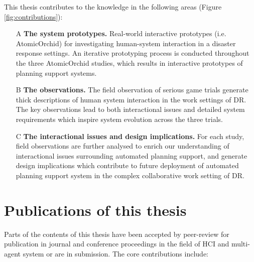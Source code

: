 This thesis contributes to the knowledge in the following areas (Figure \ref{fig:contributions}): \\

\begin{enumerate}
  \item[A] \textbf{The system prototypes.} Real-world interactive prototypes (i.e. AtomicOrchid) for investigating human-system interaction in a disaster response settings. An iterative prototyping process is conducted throughout the three AtomicOrchid studies, which results in interactive prototypes of planning support systems. 
  
  \item[B] \textbf{The observations.} The field observation of serious game trials generate thick descriptions of human system interaction in the work settings of \ac{DR}. The key observations lead to both interactional issues and detailed system requirements which inspire system evolution across the three trials.
  
  \item[C] \textbf{The interactional issues and design implications.} For each study, field observations are further analysed to enrich our understanding of interactional issues surrounding automated planning support, and generate design implications which contribute to future deployment of automated planning support system in the complex collaborative work setting of \ac{DR}. 
\end{enumerate}


\section{Publications of this thesis} 
Parts of the contents of this thesis have been accepted by peer-review for publication in journal and conference proceedings in the field of \ac{HCI} and multi-agent system or are in submission. The core contributions include: \\


